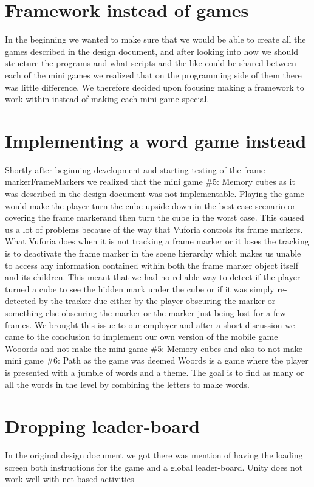 \section{Framework instead of games}
In the beginning we wanted to make sure that we would be able to create all the games described in the design document, and after looking into how we should structure the programs and what scripts and the like could be shared between each of the mini games we realized that on the programming side of them there was little difference. We therefore decided upon focusing making a framework to work within instead of making each mini game special.

\section{Implementing a word game instead}
Shortly after beginning development and starting testing of the frame marker\gls{FrameMarker}s we realized that the mini game \#5: Memory cubes as it was described in the design document was not implementable. Playing the game would make the player turn the cube upside down in the best case scenario or covering the frame markerand then turn the cube in the worst case. This caused us a lot of problems because of the way that Vuforia controls its frame markers. What Vuforia does when it is not tracking a frame marker or it loses the tracking is to deactivate the frame marker in the scene hierarchy which makes us unable to access any information contained within both the frame marker object itself and its children. This meant that we had no reliable way to detect if the player turned a cube to see the hidden mark under the cube or if it was simply re-detected by the tracker due either by the player obscuring the marker or something else obscuring the marker or the marker just being lost for a few frames. We brought this issue to our employer and after a short discussion we came to the conclusion to implement our own version of the mobile game Wooords and not make the mini game \#5: Memory cubes and also to not make mini game \#6: Path as the game was deemed %
Woords is a game where the player is presented with a jumble of words and a theme. The goal is to find as many or all the words in the level by combining the letters to make words.


\section{Dropping leader-board}
In the original design document we got there was mention of having the loading screen both instructions for the game and a global leader-board. Unity does not work well with net based activities 

